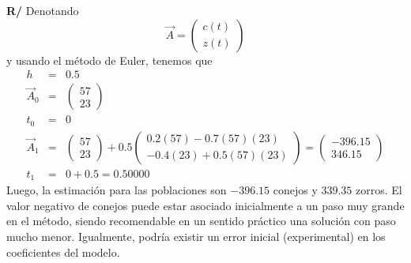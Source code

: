 \documentclass[12pt]{article}
\begin{document}
\begin{enumerate}[leftmargin=*,widest=9]
\begin{enumerate}[label=\alph*]
\textbf{R/}
Denotando
\[
\vec{A} = \begin{pmatrix}c(t)\\z(t)\end{pmatrix}
\]
y usando el método de Euler, tenemos que
\begin{eqnarray*}
h &=& 0.5\\
\vec{A}_0 &=& \begin{pmatrix}57\\23\end{pmatrix}\\
t_0 &=& 0\\
\vec{A}_1 &=& \begin{pmatrix}57\\23\end{pmatrix} + 0.5\begin{pmatrix}0.2(57) - 0.7(57)(23)\\ -0.4(23)+0.5(57)(23)\end{pmatrix}=\begin{pmatrix}-396.15\\346.15\end{pmatrix}\\
t_1 &=& 0 + 0.5 = 0.50000
\end{eqnarray*}
Luego, la estimación para las poblaciones son \(-396.15\) conejos y \(339.35\) zorros. El valor negativo de conejos puede estar asociado inicialmente a un paso muy grande en el método, siendo recomendable en un sentido práctico una solución con paso mucho menor. Igualmente, podría existir un error inicial (experimental) en los coeficientes del modelo.
    \end{enumerate}
\end{enumerate}
\end{document}
